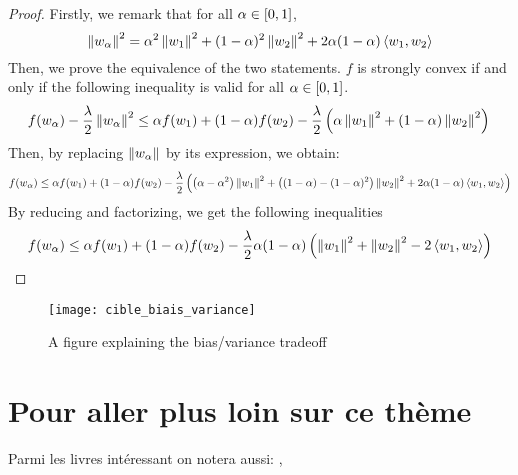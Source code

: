 \documentclass{article}
\begin{document}
\begin{proof}
Firstly, we remark that for all $\alpha \in [0,1]$,
$$ \left\| w_{\alpha} \right\|^2 = \alpha^2\left\| w_1 \right\|^2 + (1-\alpha)^2\left\| w_2 \right\|^2 + 2 \alpha (1-\alpha) \left< {w_1 ,w_2} \right>$$
Then, we prove the equivalence of the two statements.
$f$ is strongly convex if and only if the following inequality is valid for all $\alpha \in [0,1]$.
\begin{equation*}
f(w_{\alpha}) - \frac{\lambda}{2} \left\| w_{\alpha} \right\|^2 \leq  \alpha f(w_1) + (1-\alpha) f(w_2) - \frac{\lambda}{2} \left( \alpha \left\| w_1 \right\|^2 + (1-\alpha)\left\| w_2 \right\|^2\right)\\
\end{equation*}
Then, by replacing $\left\| w_{\alpha} \right\|$ by its expression, we obtain:
\begin{equation*}
f(w_{\alpha}) \leq \alpha f(w_1) + (1-\alpha) f(w_2) -
 \frac{\lambda}{2} \left( \left(\alpha-\alpha^2\right) \left\| w_1 \right\|^2 +\left((1-\alpha)-(1-\alpha)^2\right)\left\| w_2 \right\|^2 + 2 \alpha(1-\alpha)\left< {w_1 ,w_2} \right>\right)
\end{equation*}
By reducing and factorizing, we get the following inequalities
\begin{equation*}
f(w_{\alpha}) \leq \alpha f(w_1) + (1-\alpha) f(w_2) -
 \frac{\lambda}{2} \alpha (1-\alpha) \left( \left\| w_1 \right\|^2 +\left\| w_2 \right\|^2 - 2 \left< {w_1 ,w_2} \right>\right)
\end{equation*}
\end{proof}

\begin{figure}[htbp]
  \centering
  \texttt{[image: cible\_biais\_variance]}
  \caption{A figure explaining the bias/variance tradeoff}
  \label{fig:my_nice_figure}
\end{figure}


\section{Pour aller plus loin sur ce thème}
\label{sec:pour_aller_plus_loin_sur_ce_theme}

Parmi les livres intéressant on notera aussi:
\cite{Boyd_Vandenberghe04}, \cite{Beck17}




\end{document}
